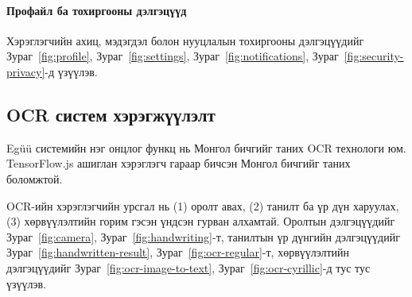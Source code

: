 \paragraph{Профайл ба тохиргооны дэлгэцүүд}
Хэрэглэгчийн ахиц, мэдэгдэл болон нууцлалын тохиргооны дэлгэцүүдийг Зураг~\ref{fig:profile}, Зураг~\ref{fig:settings}, Зураг~\ref{fig:notifications}, Зураг~\ref{fig:security-privacy}-д үзүүлэв.

\vspace{0.8em}
\noindent
\begin{minipage}[t]{0.48\textwidth}
    \figProfileScreen
\end{minipage}\hspace{0.02\textwidth}
\begin{minipage}[t]{0.48\textwidth}
    \figSettingsScreen
\end{minipage}

\vspace{0.8em}
\noindent
\begin{minipage}[t]{0.48\textwidth}
    \figNotificationScreen
\end{minipage}\hspace{0.02\textwidth}
\begin{minipage}[t]{0.48\textwidth}
    \figSecurityPrivacyScreen
\end{minipage}











\subsection{OCR систем хэрэгжүүлэлт}
\label{subsec:ocr-implementation}

Egüü системийн нэг онцлог функц нь Монгол бичгийг таних OCR технологи юм. TensorFlow.js ашиглан хэрэглэгч гараар бичсэн Монгол бичгийг таних боломжтой.

OCR-ийн хэрэглэгчийн урсгал нь (1) оролт авах, (2) танилт ба үр дүн харуулах, (3) хөрвүүлэлтийн горим гэсэн үндсэн гурван алхамтай. Оролтын дэлгэцүүдийг Зураг~\ref{fig:camera}, Зураг~\ref{fig:handwriting}-т, танилтын үр дүнгийн дэлгэцүүдийг Зураг~\ref{fig:handwritten-result}, Зураг~\ref{fig:ocr-regular}-т, хөрвүүлэлтийн дэлгэцүүдийг Зураг~\ref{fig:ocr-image-to-text}, Зураг~\ref{fig:ocr-cyrillic}-д тус тус үзүүлэв.

